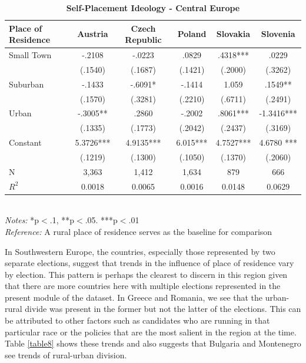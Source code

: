 \documentclass[12pt, titlepage]{article}
\newcommand\e{\emph}
\newcommand\tb{\textbf}
\begin{document}
\begin{table}[H]
	\centering
	\caption{\tb{Self-Placement Ideology - Central Europe}}
	\begin{tabulary}{\linewidth}{l c c c c c}
		\\
		\hline
		\tb{Place of Residence} &\tb{Austria}&\tb{Czech Republic}& \tb{Poland} &\tb{Slovakia}&\tb{Slovenia} \\
		\hline
		Small Town&-.2108& -.0223 & .0829 & .4318*** & .0229 \\
		&(.1540) & (.1687) & (.1421) & (.2000) & (.3262)\\
		Suburban&-.1433& -.6091*& -.1414 & 1.059& .1549** \\
		&(.1570)&(.3281) & (.2210) & (.6711) & (.2491)\\
		Urban&-.3005**&.2860 & -.2002 & .8061*** & -1.3416***\\
		&(.1335) &(.1773) & (.2042) & (.2437) & (.3169)\\
		Constant& 5.3726***& 4.9135***& 6.015*** & 4.7527***  & 4.6780 ***\\
		&(.1219) & (.1300) & (.1050) & (.1370) & (.2060)\\
		N&3,363& 1,412& 1,634 & 879& 666 \\
		$R^2$&0.0018&0.0065 & 0.0016 & 0.0148 & 0.0629\\
		\hline
		\end{tabulary}
	\\
	\e{Notes:} *p$<$.1, **p$<$.05. ***p$<$.01 \\
	\e{Reference:} A rural place of residence serves as the baseline for comparison
	\label{table7}
	\end{table}

In Southwestern Europe, the countries, especially those represented by two separate elections, suggest that trends in the influence of place of residence vary by election. This pattern is perhaps the clearest to discern in this region given that there are more countries here with multiple elections represented in the present module of the dataset. In Greece and Romania, we see that the urban-rural divide was present in the former but not the latter of the elections. This can be attributed to other factors such as candidates who are running in that particular race or the policies that are the most salient in the region at the time. Table \ref{table8} shows these trends and also suggests that Bulgaria and Montenegro see trends of rural-urban division.
\end{document}

